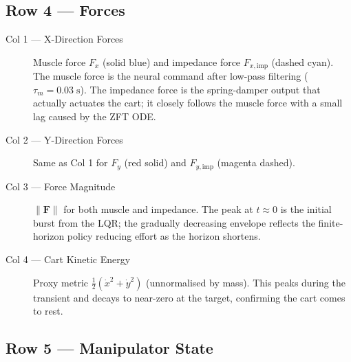 \documentclass[11pt, a4paper]{article}
\begin{document}
\subsection*{Row 4 — Forces}

\begin{description}
  \item[Col 1 — X-Direction Forces]
    Muscle force $F_x$ (solid blue) and impedance force $F_{x,\mathrm{imp}}$
    (dashed cyan).
    The muscle force is the neural command after low-pass filtering ($\tau_m = 0.03\;\mathrm{s}$).
    The impedance force is the spring-damper output that actually actuates the cart;
    it closely follows the muscle force with a small lag caused by the ZFT ODE.

  \item[Col 2 — Y-Direction Forces]
    Same as Col 1 for $F_y$ (red solid) and $F_{y,\mathrm{imp}}$ (magenta dashed).

  \item[Col 3 — Force Magnitude]
    $\|\bm{F}\|$ for both muscle and impedance.
    The peak at $t \approx 0$ is the initial burst from the LQR; the
    gradually decreasing envelope reflects the finite-horizon policy
    reducing effort as the horizon shortens.

  \item[Col 4 — Cart Kinetic Energy]
    Proxy metric $\frac{1}{2}(\dot{x}^2 + \dot{y}^2)$ (unnormalised by mass).
    This peaks during the transient and decays to near-zero at the target,
    confirming the cart comes to rest.
\end{description}

\subsection*{Row 5 — Manipulator State}
\end{document}
